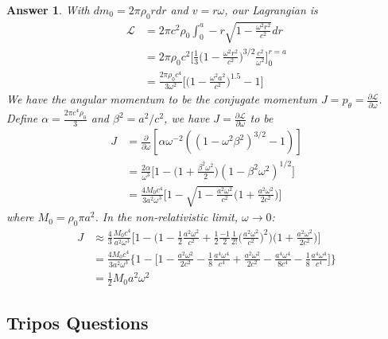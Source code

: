 \documentclass[a4paper]{article}
\newtheorem{ans}{Answer}[section]
\theoremstyle{new}
\begin{document}
\begin{ans}
With $dm_0=2\pi\rho_0rdr$ and $v=r\omega$, our Lagrangian is
\begin{align}
\mathcal{L}&=2\pi c^2\rho_0\int_0^a-r\sqrt{1-\frac{\omega^2r^2}{c^2}}dr\nonumber\\&=2\pi\rho_0c^2\bigg[\frac{1}{3}\bigg(1-\frac{\omega^2r^2}{c^2}\bigg)^{3/2}\frac{c^2}{\omega^2}\bigg]_0^{r=a}\nonumber\\&=\frac{2\pi\rho_0c^4}{3\omega^2}\bigg[\bigg(1-\frac{\omega^2a^2}{c^2}\bigg)^{1.5}-1\bigg]\nonumber
\end{align}
We have the angular momentum to be the conjugate momentum $J=p_\theta=\frac{\partial\mathcal{L}}{\partial\omega}$. Define $\alpha=\frac{2\pi c^4\rho_0}{3}$ and $\beta^2=a^2/c^2$, we have $J=\frac{\partial\mathcal{L}}{\partial\omega}$ to be
\begin{align}
J&=\frac{\partial}{\partial\omega}[\alpha\omega^{-2}((1-\omega^2\beta^2)^{3/2}-1)]\nonumber\\&=\frac{2\alpha}{\omega^3}\bigg[1-\bigg(1+\frac{\beta^2\omega^2}{2}\bigg)(1-\beta^2\omega^2)^{1/2}\bigg]\nonumber\\&=\frac{4M_0c^4}{3a^2\omega^3}\bigg[1-\sqrt{1-\frac{a^2\omega^2}{c^2}}\bigg(1+\frac{a^2\omega^2}{2c^2}\bigg)\bigg]\nonumber
\end{align}
where $M_0=\rho_0\pi a^2$. In the non-relativistic limit, $\omega\rightarrow 0$:
\begin{align}
J&\approx\frac{4}{3}\frac{M_0c^4}{a^2\omega^3}\bigg[1-\bigg(1-\frac{1}{2}\frac{a^2\omega^2}{c^2}+\frac{1}{2}\frac{-1}{2}\frac{1}{2!}\bigg(\frac{a^2\omega^2}{c^2}\bigg)^2\bigg)\bigg(1+\frac{a^2\omega^2}{2c^2}\bigg)\bigg]\nonumber\\&=\frac{4M_0c^4}{3a^2\omega^3}\bigg\{1-\bigg[1-\frac{a^2\omega^2}{2c^2}-\frac{1}{8}\frac{a^4\omega^4}{c^4}+\frac{a^2\omega^2}{2c^2}-\frac{a^4\omega^4}{8c^4}-\frac{1}{8}\frac{a^4\omega^4}{c^4}\bigg]\bigg\}\nonumber\\&=\frac{1}{2}M_0a^2\omega^2\nonumber
\end{align}
\end{ans}
\newpage
\subsection{Tripos Questions}
\end{document}
